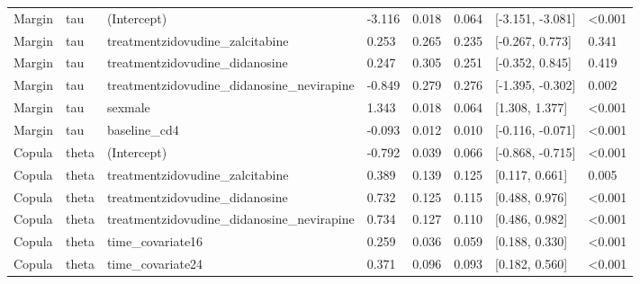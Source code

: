 \begin{table}
\begin{tabular}[t]{llllllll}
Margin & tau & (Intercept) & -3.116 & 0.018 & 0.064 & {}[-3.151, -3.081] & <0.001\\
Margin & tau & treatmentzidovudine\_zalcitabine & 0.253 & 0.265 & 0.235 & {}[-0.267, 0.773] & 0.341\\
Margin & tau & treatmentzidovudine\_didanosine & 0.247 & 0.305 & 0.251 & {}[-0.352, 0.845] & 0.419\\
Margin & tau & treatmentzidovudine\_didanosine\_nevirapine & -0.849 & 0.279 & 0.276 & {}[-1.395, -0.302] & 0.002\\
\addlinespace
Margin & tau & sexmale & 1.343 & 0.018 & 0.064 & {}[1.308, 1.377] & <0.001\\
Margin & tau & baseline\_cd4 & -0.093 & 0.012 & 0.010 & {}[-0.116, -0.071] & <0.001\\
Copula & theta & (Intercept) & -0.792 & 0.039 & 0.066 & {}[-0.868, -0.715] & <0.001\\
Copula & theta & treatmentzidovudine\_zalcitabine & 0.389 & 0.139 & 0.125 & {}[0.117, 0.661] & 0.005\\
Copula & theta & treatmentzidovudine\_didanosine & 0.732 & 0.125 & 0.115 & {}[0.488, 0.976] & <0.001\\
\addlinespace
Copula & theta & treatmentzidovudine\_didanosine\_nevirapine & 0.734 & 0.127 & 0.110 & {}[0.486, 0.982] & <0.001\\
Copula & theta & time\_covariate16 & 0.259 & 0.036 & 0.059 & {}[0.188, 0.330] & <0.001\\
Copula & theta & time\_covariate24 & 0.371 & 0.096 & 0.093 & {}[0.182, 0.560] & <0.001\\
\bottomrule
\end{tabular}
\end{table}

